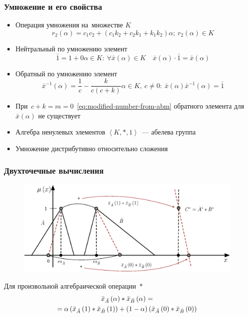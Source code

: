 \documentclass[12pt]{beamer}
\begin{document}
\begin{frame}
  \frametitle{Умножение и его свойства}
  \begin{itemize}
    \item Операция умножения на~множестве $K$
      \begin{equation}
      \label{eq:fuzzy-multiplication}
        r_2\left( \alpha \right)=c_1 c_2+\left(c_1 k_2+ c_2 k_1 +k_1 k_2 \right)\alpha;\ r_2\left( \alpha  \right)\in K
      \end{equation}
    \item Нейтральный по умножению элемент
      \begin{equation}
        \label{eq:fuzzy-one}
        \bar{1}=1+0\alpha \in K:\ \forall \bar{x}\left( \alpha  \right)\in K\quad \bar{x}\left( \alpha  \right)\cdot \bar{1}=\bar{x}\left( \alpha  \right)
      \end{equation}
    \item Обратный по умножению элемент
      \begin{equation}
        \label{eq:fuzzy-division}
        \bar{x}^{-1}(\alpha )=\frac{1}{c}-\frac{k}{c\left(c+k\right)}\alpha \in K,\ c\ne 0:\ \bar{x}\left(\alpha \right){{\bar{x}}^{-1}}\left( \alpha  \right)=\bar{1}
      \end{equation}
    \item При~$c+k=m=0$~\eqref{eq:modified-number-from-abm} обратного элемента для $\bar{x}\left( \alpha  \right)$ не существует
    \item Алгебра ненулевых элементов $\left \langle K,*,1 \right \rangle$~--- абелева группа
    \item Умножение дистрибутивно относительно сложения
  \end{itemize}
\end{frame}


\begin{frame}
  \frametitle{Двухточечные вычисления}
  \begin{figure}[h]
    \includegraphics[width=\textwidth]{two-point}
  \end{figure}
  Для произвольной алгебраической операции~$*$
  \begin{gather}
    \bar{x}_{\tilde A}\left( \alpha \right)*\bar{x}_{\tilde B}\left(\alpha \right)=\notag\\
    \label{eq:two-point-calculations}
    =\alpha \left(\bar{x}_{\tilde A}\left( 1 \right)*\bar{x}_{\tilde B}\left(1 \right) \right)+\left(1-\alpha \right)\left(\bar{x}_{\tilde A}\left(0 \right)*\bar{x}_{\tilde B}\left(0 \right) \right)
  \end{gather}
\end{frame}
\end{document}
